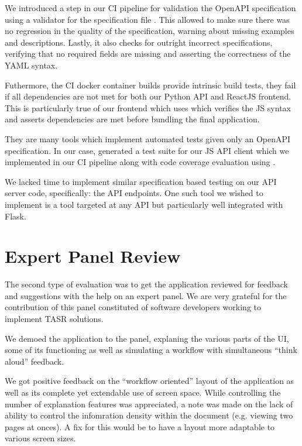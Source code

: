 \documentclass[\version]{l4proj}
\begin{document}
We introduced a step in our CI pipeline for validation the OpenAPI specification using a validator for the specification file \autocite{IBMOpenapivalidator2020}.
This allowed to make sure there was no regression in the quality of the specification, warning about missing examples and descriptions.
Lastly, it also checks for outright incorrect specifications, verifying that no required fields are missing and asserting the correctness of the YAML syntax.

Futhermore, the CI docker container builds provide intrinsic build tests, they fail if all dependencies are not met for both our Python API and ReactJS frontend.
This is particularly true of our frontend which uses \textcite{ParcelbundlerParcel2020} which verifies the JS syntax and asserts dependencies are met before bundling the final application.

They are many tools which implement automated tests given only an OpenAPI specification.
In our case, \textcite{OpenAPIToolsOpenapigenerator2020} generated a test suite for our JS API client which we implemented in our CI pipeline along with code coverage evaluation using \textcite{Codecov2020}.

We lacked time to implement similar specification based testing on our API server code, specifically: the API endpoints.
One such tool we wished to implement is \textcite{KiwicomSchemathesis2020} a tool targeted at any API but particularly well integrated with Flask.

\section{Expert Panel Review}

The second type of evaluation was to get the application reviewed for feedback and suggestions with the help on an expert panel.
We are very grateful for the contribution of this panel constituted of software developers working to implement TASR solutions.

We demoed the application to the panel, explaning the various parts of the UI, some of its functioning as well as simulating a workflow with simultaneous ``think aloud'' feedback.

We got positive feedback on the ``workflow oriented'' layout of the application as well as its complete yet extendable use of screen space.
While controlling the number of explanation features was appreciated, a note was made on the lack of ability to control the infomration density within the document (e.g. viewing two pages at onces).
A fix for this would be to have a layout more adaptable to various screen sizes. %
\end{document}
